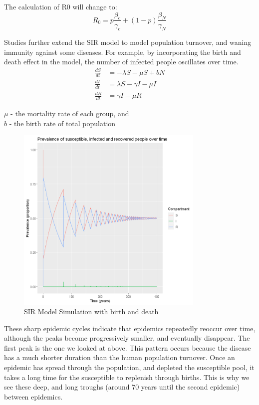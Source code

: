 \documentclass[a4paper, 12pt, twoside]{report}
\begin{document}
The calculation of \gls{R0} will change to:
\begin{equation}
	R_0 = p \frac{\beta_c}{\gamma_c} + (1-p) \frac{\beta_N}{\gamma_N}
\end{equation}

Studies further extend the SIR model to model population turnover, and waning immunity against some diseases.
For example, by incorporating the birth and death effect in the model, the number of infected people oscillates over time.
\begin{align}
	\frac{dS}{dt} & = - \lambda S - \mu S + bN     \\
	\frac{dI}{dt} & = \lambda S - \gamma I - \mu I \\
	\frac{dR}{dt} & = \gamma I - \mu R
\end{align}
\begin{center}
	$\mu$ - the mortality rate of each group, and \\
	$b$ - the birth rate of total population \\
\end{center}

\begin{figure}[htpb]
	\centering
	\includegraphics[width=0.8\textwidth]{sir-model-birth-death}
	\caption{SIR Model Simulation with birth and death}
	\label{fig:sir-model-birth-death}
\end{figure}

These sharp epidemic cycles indicate that epidemics repeatedly reoccur over time, although the peaks become progressively smaller, and eventually disappear.
The first peak is the one we looked at above.
This pattern occurs because the disease has a much shorter duration than the human population turnover.
Once an epidemic has spread through the population, and depleted the susceptible pool, it takes a long time for the susceptible to replenish through births.
This is why we see these deep, and long troughs (around 70 years until the second epidemic) between epidemics.
\end{document}

